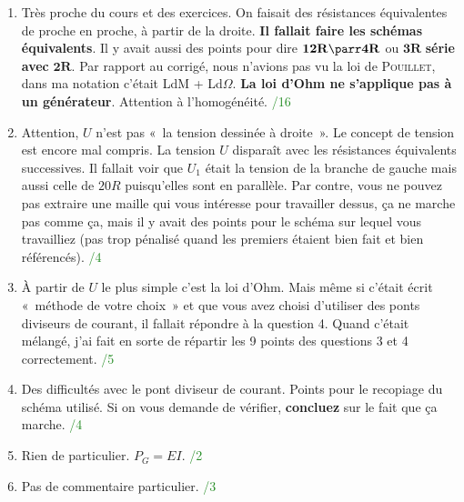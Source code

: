 \documentclass[a4paper, 10pt, final, garamond]{book}
\begin{document}
\begin{enumerate}
    \item Très proche du cours et des exercices. On faisait des résistances
        équivalentes de proche en proche, à partir de la droite. \textbf{Il
        fallait faire les schémas équivalents}. Il y avait aussi des points pour
        dire $\mathbf{12R\parr 4R}$ ou $\mathbf{3R}$\textbf{ série avec
        }$\mathbf{2R}$. Par rapport au corrigé, nous n'avions pas vu la loi de
        \textsc{Pouillet}, dans ma notation c'était LdM + Ld$\Omega$. \textbf{La
        loi d'Ohm ne s'applique pas à un générateur}. Attention à l'homogénéité.
        \hfill \textcolor{ForestGreen}{/16}

    \item Attention, $U$ n'est pas «~la tension dessinée à droite~». Le concept
        de tension est encore mal compris. La tension $U$ disparaît avec les
        résistances équivalents successives. Il fallait voir que $U_1$ était la
        tension de la branche de gauche mais aussi celle de $20R$ puisqu'elles
        sont en parallèle. Par contre, vous ne pouvez pas extraire une maille
        qui vous intéresse pour travailler dessus, ça ne marche pas comme ça,
        mais il y avait des points pour le schéma sur lequel vous travailliez
        (pas trop pénalisé quand les premiers étaient bien fait et bien
        référencés).
        \hfill \textcolor{ForestGreen}{/4}

    \item À partir de $U$ le plus simple c'est la loi d'Ohm. Mais même si
        c'était écrit «~méthode de votre choix~» et que vous avez choisi
        d'utiliser des ponts diviseurs de courant, il fallait répondre à la
        question 4. Quand c'était mélangé, j'ai fait en sorte de répartir les 9
        points des questions 3 et 4 correctement. \hfill
        \textcolor{ForestGreen}{/5}

    \item Des difficultés avec le pont diviseur de courant. Points pour le
        recopiage du schéma utilisé. Si on vous demande de vérifier,
        \textbf{concluez} sur le fait que ça marche. \hfill
        \textcolor{ForestGreen}{/4}

    \item Rien de particulier. $P_G = EI$. \hfill \textcolor{ForestGreen}{/2}

    \item Pas de commentaire particulier. \hfill \textcolor{ForestGreen}{/3}
\end{enumerate}
\end{document}
